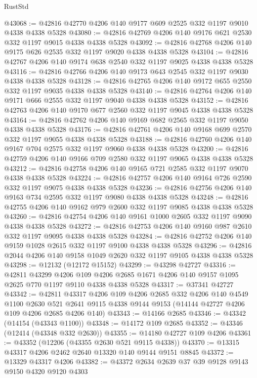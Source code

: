 \begin{lexlean}{RustStd}
\begin{coremodule}
@43068 := @42816 @42770 @4206 @140 @9177 @609 @2525 @332 @1197 @9010 @4338 @4338 @5328
@43080 := @42816 @42769 @4206 @140 @9176 @621 @2530 @332 @1197 @9015 @4338 @4338 @5328
@43092 := @42816 @42768 @4206 @140 @9175 @626 @2535 @332 @1197 @9020 @4338 @4338 @5328
@43104 := @42816 @42767 @4206 @140 @9174 @638 @2540 @332 @1197 @9025 @4338 @4338 @5328
@43116 := @42816 @42766 @4206 @140 @9173 @643 @2545 @332 @1197 @9030 @4338 @4338 @5328
@43128 := @42816 @42765 @4206 @140 @9172 @655 @2550 @332 @1197 @9035 @4338 @4338 @5328
@43140 := @42816 @42764 @4206 @140 @9171 @666 @2555 @332 @1197 @9040 @4338 @4338 @5328
@43152 := @42816 @42763 @4206 @140 @9170 @677 @2560 @332 @1197 @9045 @4338 @4338 @5328
@43164 := @42816 @42762 @4206 @140 @9169 @682 @2565 @332 @1197 @9050 @4338 @4338 @5328
@43176 := @42816 @42761 @4206 @140 @9168 @699 @2570 @332 @1197 @9055 @4338 @4338 @5328
@43188 := @42816 @42760 @4206 @140 @9167 @704 @2575 @332 @1197 @9060 @4338 @4338 @5328
@43200 := @42816 @42759 @4206 @140 @9166 @709 @2580 @332 @1197 @9065 @4338 @4338 @5328
@43212 := @42816 @42758 @4206 @140 @9165 @721 @2585 @332 @1197 @9070 @4338 @4338 @5328
@43224 := @42816 @42757 @4206 @140 @9164 @726 @2590 @332 @1197 @9075 @4338 @4338 @5328
@43236 := @42816 @42756 @4206 @140 @9163 @734 @2595 @332 @1197 @9080 @4338 @4338 @5328
@43248 := @42816 @42755 @4206 @140 @9162 @979 @2600 @332 @1197 @9085 @4338 @4338 @5328
@43260 := @42816 @42754 @4206 @140 @9161 @1000 @2605 @332 @1197 @9090 @4338 @4338 @5328
@43272 := @42816 @42753 @4206 @140 @9160 @987 @2610 @332 @1197 @9095 @4338 @4338 @5328
@43284 := @42816 @42752 @4206 @140 @9159 @1028 @2615 @332 @1197 @9100 @4338 @4338 @5328
@43296 := @42816 @2044 @4206 @140 @9158 @1049 @2620 @332 @1197 @9105 @4338 @4338 @5328
@43298 := @12132 (@12172 @15152)
@43299 := @43298 @42727
@43316 := @42811
    @43299
    @4206
    @109
    @4206
    @2685
    @1671
    @4206
    @140
    @9157
    @1095
    @2625
    @770
    @1197
    @9110
    @4338
    @4338
    @5328
@43317 := @37341 @42727
@43342 := @42811
    @43317
    @4206
    @109
    @4206
    @2685
    @332
    @4206
    @140
    @4549
    @1100
    @2630
    @521
    @2641
    @9115
    @4338
    @9144
    @9153
    (@14144 @42727 @4206 @109 @4206 @2685 @4206 @140)
@43343 := @14166 @2685
@43346 := @43342 (@14154 (@43343 @1100))
@43348 := @14172 @109 @2685
@43352 := @43346 (@12414 (@43348 @332 @2630))
@43355 := @14180 @42727 @109 @4206
@43361 := @43352 (@12206 (@43355 @2630 @521 @9115 @4338))
@43370 := @13315 @43317 @4206 @2462 @2640 @13320 @140 @9144 @9151 @8845
@43372 := @13329 @43317 @4206
@43382 := @43372 @2634 @2639 @37 @39 @9128 @9143 @9150 @4320 @9120 @4303

\end{coremodule}
\end{lexlean}
